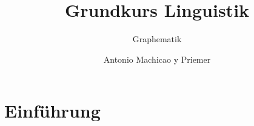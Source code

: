 \togglefalse{uebung}


\title{Grundkurs Linguistik}

\subtitle{Graphematik}

\author[aMyP]{
	{\small Antonio Machicao y Priemer}
}



\date{ }




\huberlintitlepage[22pt]




\nocite{Brandt&Co06a}
\nocite{Glueck05a} 
\nocite{Luedeling2009a} 
\nocite{Repp&Co15a}

\nocite{Altmann&Co07a}
\nocite{Eisenberg00a}
\nocite{Fuhrhop08a}
\nocite{Fuhrhop09a}
\nocite{Fuhrhop&Co13a}



\section{Einführung}


